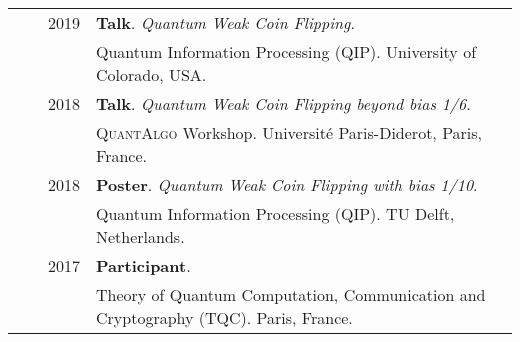 \documentclass[a4paper,10pt]{article}
\begin{document}
\begin{longtable}{rrp{11cm}}
  & ~~2019 &\textbf{Talk}. \emph{Quantum Weak Coin Flipping}. \\
  & ~~~~~~ &Quantum Information Processing (\textsc{QIP}). University of Colorado, USA. \\
  & ~~2018 &\textbf{Talk}. \emph{Quantum Weak Coin Flipping beyond bias 1/6}. \\  
  & ~~~~~~ &\textsc{QuantAlgo} Workshop. Université Paris-Diderot, Paris, France. \\
  & ~~2018 &\textbf{Poster}. \emph{Quantum Weak Coin Flipping with bias 1/10}. \\
  & ~~~~~~ &Quantum Information Processing (\textsc{QIP}). TU Delft, Netherlands. \\
  & ~~2017 &\textbf{Participant}. \\
  & ~~~~~~ &Theory of Quantum Computation, Communication and Cryptography (\textsc{TQC}). Paris, France.
  \end{longtable}

\end{document}
